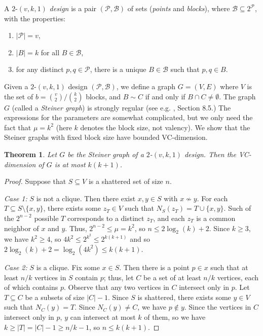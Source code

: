 \documentclass{article}
\newcommand\sm{\setminus}
\newtheorem{thm}{Theorem}
\theoremstyle{definition}
\begin{document}
A $2$-$(v,k,1)$ \textit{design} is a pair $(\mathcal P,\mathcal B)$ of sets (\textit{points} and \textit{blocks}), where $\mathcal B\subseteq 2^\mathcal P$, with the properties:
\begin{enumerate}
    \item $|\mathcal P|=v$,
    \item $|B|=k$ for all $B\in\mathcal B$,
    \item for any distinct $p,q\in\mathcal P$, there is a unique $B\in\mathcal B$ such that $p,q\in B$.
\end{enumerate}

Given a $2$-$(v,k,1)$ design $(\mathcal P,\mathcal B)$, we define a graph $G=(V,E)$ where $V$ is the set of $b={v\choose 2}/{k\choose 2}$ blocks, and $B\sim C$ if and only if $B\cap C\ne\emptyset$. The graph $G$ (called a \textit{Steiner graph}) is strongly regular (see e.g. \cite{brouwer2022strongly}, Section 8.5.) The expressions for the parameters are somewhat complicated, but we only need the fact that $\mu=k^2$ (here $k$ denotes the block size, not valency). We show that the Steiner graphs with fixed block size have bounded VC-dimension.

\begin{thm} \label{Theorem Steiner} Let $G$ be the Steiner graph of a $2$-$(v,k,1)$ design. Then the VC-dimension of $G$ is at most $k(k+1)$.
\end{thm}
\begin{proof}
    Suppose that $S\subseteq V$ is a shattered set of size $n$. 

    \textit{Case 1:} $S$ is not a clique. Then there exist $x,y\in S$ with $x\not\sim y$. For each $T\subseteq S\sm\{x,y\}$, there exists some $z_T\in V$ such that $N_S(z_T)=T\cup\{x,y\}$. Such of the $2^{n-2}$ possible $T$ corresponds to a distinct $z_T$, and each $z_T$ is a common neighbor of $x$ and $y$. Thus, $2^{n-2}\le\mu=k^2$, so $n\le 2\log_2(k)+2$. Since $k\ge 3$, we have $k^2\ge 4$, so $4k^2\le 2^{k^2}\le 2^{k(k+1)}$ and so $2\log_2(k)+2=\log_2(4k^2)\le k(k+1)$.

    \textit{Case 2:} $S$ is a clique. Fix some $x\in S$. Then there is a point $p\in x$ such that at least $n/k$ vertices in $S$ contain $p$; thus, let $C$ be a set of at least $n/k$ vertices, each of which contains $p$. Observe that any two vertices in $C$ intersect only in $p$. Let $T\subseteq C$ be a subsets of size $|C|-1$. Since $S$ is shattered, there exists some $y\in V$ such that $N_C(y)=T$. Since $N_C(y)\ne C$, we have $p\not\in y$. Since the vertices in $C$ intersect only in $p$, $y$ can intersect at most $k$ of them, so we have $k\ge |T|=|C|-1\ge n/k-1$, so $n\le k(k+1)$.
\end{proof}
\end{document}
